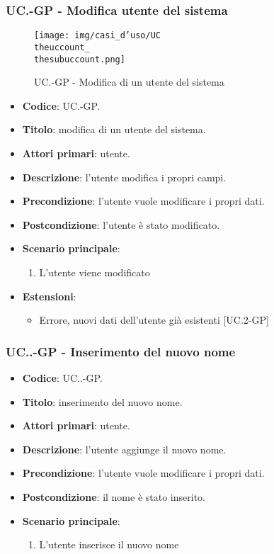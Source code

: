 		\subsubsection{UC\theuccount.\thesubuccount-GP - Modifica utente del sistema}
			\begin{figure}[H]
				\centering
				\texttt{[image: img/casi\_d'uso/UC\\theuccount\_\\thesubuccount.png]}\\
				\caption{UC\theuccount.\thesubuccount-GP - Modifica di un utente del sistema}
			\end{figure}
			\begin{itemize}
				\item \textbf{Codice}: UC\theuccount.\thesubuccount-GP.
				\item \textbf{Titolo}: modifica di un utente del sistema.
				\item \textbf{Attori primari}: utente.
				\item \textbf{Descrizione}: l'utente modifica i propri campi.
				\item \textbf{Precondizione}: l'utente vuole modificare i propri dati.
				\item \textbf{Postcondizione}: l'utente è stato modificato.
				\item \textbf{Scenario principale}:
				\begin{enumerate}
					\item L'utente viene modificato
				\end{enumerate}
				\item \textbf{Estensioni}:
				\begin{itemize}
					\item Errore, nuovi dati dell'utente già esistenti [UC\theuccount.2-GP]
				\end{itemize}
			\end{itemize}

			\subsubsection{UC\theuccount.\thesubuccount.\thesubsubuccount-GP - Inserimento del nuovo nome}

				\begin{itemize}
					\item \textbf{Codice}: UC\theuccount.\thesubuccount.\thesubsubuccount-GP.
					\item \textbf{Titolo}: inserimento del nuovo nome.
					\item \textbf{Attori primari}: utente.
					\item \textbf{Descrizione}: l'utente aggiunge il nuovo nome.
					\item \textbf{Precondizione}: l'utente vuole modificare i propri dati.
					\item \textbf{Postcondizione}: il nome è stato inserito.
					\item \textbf{Scenario principale}:
					\begin{enumerate}
						\item L'utente inserisce il nuovo nome
					\end{enumerate}
				\end{itemize}

